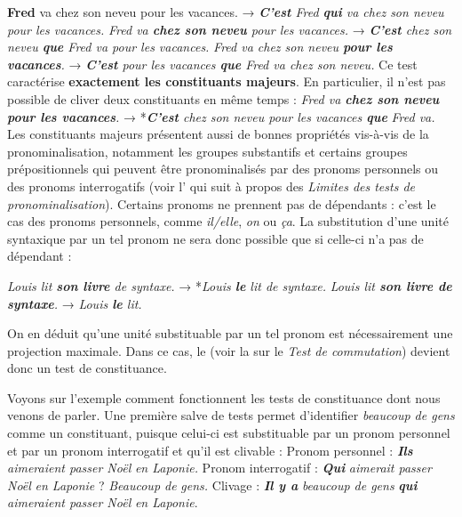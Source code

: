 \ea \ea\textbf{{Fred}}  {va chez son neveu pour les vacances.}
→ \textit{\textbf{{C’est}}  {Fred} \textbf{{qui}}  {va chez son neveu pour les vacances.}}
\ex
\textit{{Fred va} \textbf{{chez son neveu}}  {pour les vacances.}}
→ \textit{\textbf{{C’est}} chez son neveu \textbf{{que}} Fred va pour les vacances.}
\ex
\textit{{Fred va chez son neveu} \textbf{{pour les vacances}}.}
→ \textit{\textbf{{C’est}}  {pour les vacances} \textbf{{que}}  {Fred va chez son neveu.}}
\z\z
Ce test caractérise \textbf{exactement les constituants majeurs}. En particulier, il n’est pas possible de cliver deux constituants en même temps :
\ea
\textit{{Fred va} \textbf{{chez son neveu}} \textbf{{pour les vacances}}.}
→  *\textit{\textbf{{C’est}}  {chez son neveu pour les vacances} \textbf{{que}}} \textit{Fred va.}
\z
Les constituants majeurs présentent aussi de bonnes propriétés vis-à-vis de la pronominalisation, notamment les groupes substantifs et certains groupes prépositionnels qui peuvent être pronominalisés par des pronoms personnels ou des pronoms interrogatifs (voir l’ qui suit à propos des \textit{Limites des tests de pronominalisation}). Certains pronoms ne prennent pas de dépendants : c’est le cas des pronoms personnels, comme \textit{il/elle}, \textit{on} ou \textit{ça}. La substitution d’une unité syntaxique par un tel pronom ne sera donc possible que si celle-ci n’a pas de dépendant :

\ea\ea
    \textit{{Louis lit} \textbf{son livre}  {de syntaxe.}}    →  *\textit{Louis \textbf{{le}}  {lit de syntaxe.}}
\ex
    \textit{{Louis lit} \textbf{{son livre de syntaxe}}.}  →   \textit{{Louis} \textbf{{le}}  {lit.}}
\z\z

On en déduit qu’une unité substituable par un tel pronom est nécessairement une projection maximale. Dans ce cas, le  (voir la  sur le \textit{Test de commutation}) devient donc un test de constituance.

Voyons sur l'exemple  comment fonctionnent les tests de constituance dont nous venons de parler. Une première salve de tests permet d’identifier \textit{beaucoup de gens} comme un constituant, puisque celui-ci est substituable par un pronom personnel et par un pronom interrogatif et qu’il est clivable :
\ea
\ea Pronom personnel : \textbf{\textit{Ils}} \textit{aimeraient passer Noël} \textit{en Laponie.}
\ex Pronom interrogatif : \textbf{\textit{Qui}} \textit{aimerait passer Noël} \textit{en Laponie} ? \textit{Beaucoup de}                   \textit{gens.}
\ex Clivage : \textbf{\textit{Il y a}} \textit{beaucoup de gens} \textbf{\textit{qui}} \textit{aimeraient passer Noël} \textit{en Laponie}.
\z\z


